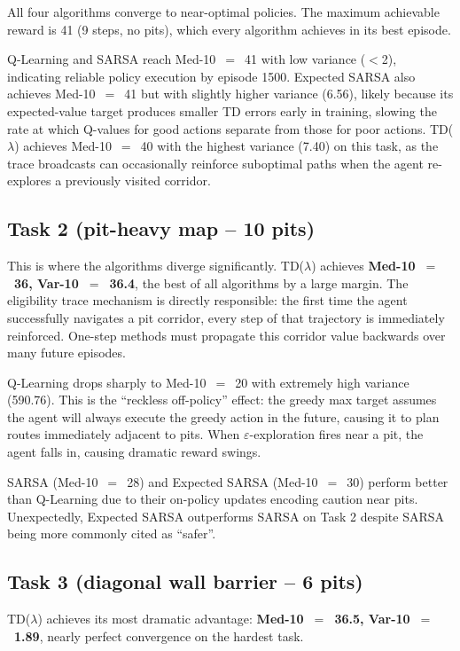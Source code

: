 \documentclass[11pt,letterpaper]{article}
\begin{document}
All four algorithms converge to near-optimal policies. The maximum achievable reward
is 41 (9 steps, no pits), which every algorithm achieves in its best episode.

Q-Learning and SARSA reach Med-10~$=$~41 with low variance ($<$2), indicating
reliable policy execution by episode 1500. Expected SARSA also achieves Med-10~$=$~41
but with slightly higher variance (6.56), likely because its expected-value target
produces smaller TD errors early in training, slowing the rate at which Q-values
for good actions separate from those for poor actions. TD($\lambda$) achieves
Med-10~$=$~40 with the highest variance (7.40) on this task, as the trace broadcasts
can occasionally reinforce suboptimal paths when the agent re-explores a previously
visited corridor.

\subsection{Task 2 (pit-heavy map -- 10 pits)}

This is where the algorithms diverge significantly.
TD($\lambda$) achieves \textbf{Med-10~$=$~36, Var-10~$=$~36.4}, the best of all
algorithms by a large margin. The eligibility trace mechanism is directly responsible:
the first time the agent successfully navigates a pit corridor, every step of that
trajectory is immediately reinforced. One-step methods must propagate this corridor
value backwards over many future episodes.

Q-Learning drops sharply to Med-10~$=$~20 with extremely high variance (590.76).
This is the ``reckless off-policy'' effect: the greedy max target assumes the agent
will always execute the greedy action in the future, causing it to plan routes
immediately adjacent to pits. When $\varepsilon$-exploration fires near a pit, the
agent falls in, causing dramatic reward swings.

SARSA (Med-10~$=$~28) and Expected SARSA (Med-10~$=$~30) perform better than Q-Learning
due to their on-policy updates encoding caution near pits. Unexpectedly, Expected SARSA
outperforms SARSA on Task 2 despite SARSA being more commonly cited as ``safer''.

\subsection{Task 3 (diagonal wall barrier -- 6 pits)}

TD($\lambda$) achieves its most dramatic advantage: \textbf{Med-10~$=$~36.5,
Var-10~$=$~1.89}, nearly perfect convergence on the hardest task.
\end{document}

